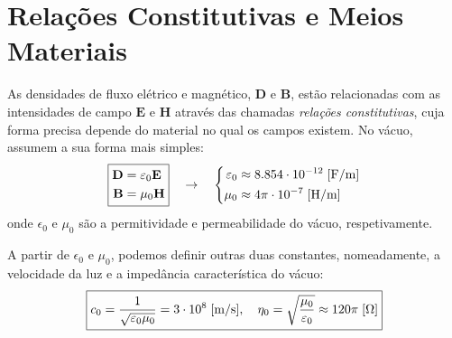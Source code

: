 \section{Relações Constitutivas e Meios Materiais}

As densidades de fluxo elétrico e magnético, $\mathbf{D}$ e $\mathbf{B}$, estão relacionadas com as intensidades de campo $\mathbf{E}$ e $\mathbf{H}$ através das chamadas \textit{relações constitutivas}, cuja forma precisa depende do material no qual os campos existem. No vácuo, assumem a sua forma mais simples:
$$
    \boxed{%
        \begin{aligned}
            \mathbf{D} &= \epsilon_{0} \mathbf{E} \\
            \mathbf{B} &= \mu_{0} \mathbf{H}
        \end{aligned}
    }
    \quad\rightarrow\quad
    \left\{
    \begin{aligned}
        \epsilon_{0} &\approx 8.854 \cdot 10^{-12} \; [\text{F/m}]\\
        \mu_{0} &\approx 4\pi \cdot 10^{-7} \; [\text{H/m}]
    \end{aligned}\right.
$$
onde $\epsilon_{0}$ e $\mu_{0}$ são a permitividade e permeabilidade do vácuo, respetivamente.

A partir de $\epsilon_{0}$ e $\mu_{0}$, podemos definir outras duas constantes, nomeadamente, a velocidade da luz e a impedância característica do vácuo:
$$
    \boxed{%
        c_0 = \frac{1}{\sqrt{\epsilon_{0} \mu_{0}}} = 3 \cdot 10^8 \; [\text{m/s}], 
        \quad
        \eta_0 = \sqrt{\frac{\mu_{0}}{\epsilon_{0}}} \approx 120\pi\; [\Omega]
    }
$$

